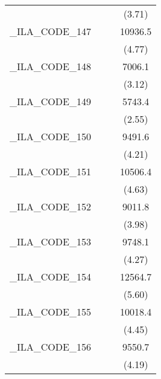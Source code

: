{\begin{tabular}{l*{3}{c}}
            &                     &                     &      (3.71)         \\
[1em]
\_ILA\_CODE\_147&                     &                     &     10936.5\sym{***}\\
            &                     &                     &      (4.77)         \\
[1em]
\_ILA\_CODE\_148&                     &                     &      7006.1\sym{**} \\
            &                     &                     &      (3.12)         \\
[1em]
\_ILA\_CODE\_149&                     &                     &      5743.4\sym{*}  \\
            &                     &                     &      (2.55)         \\
[1em]
\_ILA\_CODE\_150&                     &                     &      9491.6\sym{***}\\
            &                     &                     &      (4.21)         \\
[1em]
\_ILA\_CODE\_151&                     &                     &     10506.4\sym{***}\\
            &                     &                     &      (4.63)         \\
[1em]
\_ILA\_CODE\_152&                     &                     &      9011.8\sym{***}\\
            &                     &                     &      (3.98)         \\
[1em]
\_ILA\_CODE\_153&                     &                     &      9748.1\sym{***}\\
            &                     &                     &      (4.27)         \\
[1em]
\_ILA\_CODE\_154&                     &                     &     12564.7\sym{***}\\
            &                     &                     &      (5.60)         \\
[1em]
\_ILA\_CODE\_155&                     &                     &     10018.4\sym{***}\\
            &                     &                     &      (4.45)         \\
[1em]
\_ILA\_CODE\_156&                     &                     &      9550.7\sym{***}\\
            &                     &                     &      (4.19)         \\

\end{tabular}}
